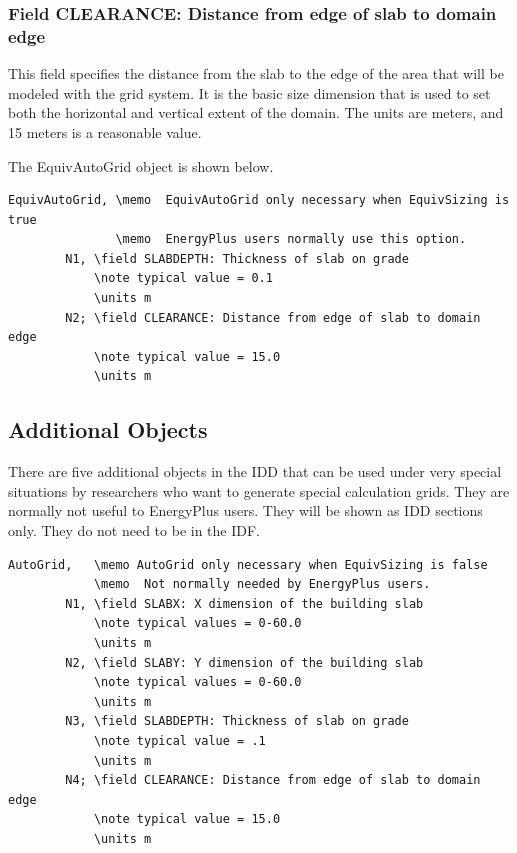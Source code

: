 \subsubsection{Field CLEARANCE: Distance from edge of slab to domain edge}\label{field-clearance-distance-from-edge-of-slab-to-domain-edge-1}

This field specifies the distance from the slab to the edge of the area that will be modeled with the grid system. It is the basic size dimension that is used to set both the horizontal and vertical extent of the domain. The units are meters, and 15 meters is a reasonable value.

The EquivAutoGrid object is shown below.

\begin{lstlisting}
EquivAutoGrid, \memo  EquivAutoGrid only necessary when EquivSizing is true
               \memo  EnergyPlus users normally use this option.
        N1, \field SLABDEPTH: Thickness of slab on grade
            \note typical value = 0.1
            \units m
        N2; \field CLEARANCE: Distance from edge of slab to domain edge
            \note typical value = 15.0
            \units m
\end{lstlisting}

\subsection{Additional Objects}\label{additional-objects-000}

There are five additional objects in the IDD that can be used under very special situations by researchers who want to generate special calculation grids. They are normally not useful to EnergyPlus users. They will be shown as IDD sections only. They do not need to be in the IDF.

\begin{lstlisting}
AutoGrid,   \memo AutoGrid only necessary when EquivSizing is false
            \memo  Not normally needed by EnergyPlus users.
        N1, \field SLABX: X dimension of the building slab
            \note typical values = 0-60.0
            \units m
        N2, \field SLABY: Y dimension of the building slab
            \note typical values = 0-60.0
            \units m
        N3, \field SLABDEPTH: Thickness of slab on grade
            \note typical value = .1
            \units m
        N4; \field CLEARANCE: Distance from edge of slab to domain edge
            \note typical value = 15.0
            \units m
\end{lstlisting}


